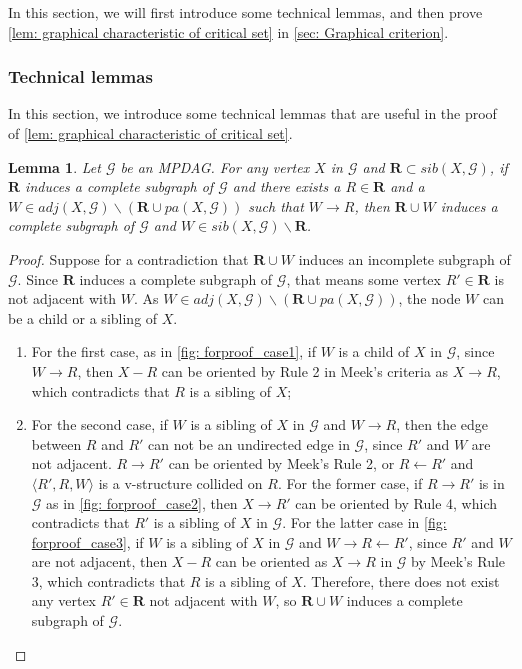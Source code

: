 \documentclass{article}
\newtheorem{lemma}[theorem]{Lemma}
\begin{document}
In this section, we will first introduce some technical lemmas, and then prove \cref{lem: graphical characteristic of critical set} in \cref{sec: Graphical criterion}. 


\subsubsection{Technical lemmas}
In this section, we introduce some technical lemmas that are useful in the proof of \cref{lem: graphical characteristic of critical set}.

\begin{lemma}\label{lem: complete2complete}
    Let $\mathcal{G}$ be an MPDAG. For any vertex $X$ in $\mathcal{G}$ and $\mathbf{R} \subset sib(X,\mathcal{G})$, if $\mathbf{R}$ induces a complete subgraph of $\mathcal{G}$ and there exists a $R \in \mathbf{R}$ and a $W \in {adj(X,\mathcal{G}) \backslash{(\mathbf{R} \cup pa(X,\mathcal{G}))}}$ such that $W \rightarrow R$, then $\mathbf{R} \cup W$ induces a complete subgraph of $\mathcal{G}$ and $W \in {sib(X,\mathcal{G}) \backslash{\mathbf{R}}}$.
\end{lemma}
\begin{proof}
     Suppose for a contradiction that $\mathbf{R} \cup W$ induces an incomplete subgraph of $\mathcal{G}$. Since $\mathbf{R}$ induces a complete subgraph of $\mathcal{G}$, that means some vertex $R' \in \mathbf{R}$ is not adjacent with $W$. As $W \in {adj(X,\mathcal{G}) \backslash{(\mathbf{R} \cup pa(X,\mathcal{G}))}}$, the node $W$ can be a child or a sibling of $X$.
     \begin{enumerate}[leftmargin=6.5mm]
        \itemsep0em
         \item [(1)] For the first case, as in \cref{fig: forproof_case1}, if $W$ is a child of $X$ in $\mathcal{G}$, since $W \rightarrow R$, then $X - R$ can be oriented by Rule 2 in Meek's criteria as $X \rightarrow R$, which contradicts that $R$ is a sibling of $X$;
         \item [(2)] For the second case, if $W$ is a sibling of $X$ in $\mathcal{G}$ and $W \rightarrow R$, then the edge between $R$ and $R'$ can not be an undirected edge in $\mathcal{G}$, since $R'$ and $W$ are not adjacent. $R \rightarrow R'$ can be oriented by Meek's Rule 2, or $R \leftarrow R'$ and $\langle R', R, W \rangle$ is a v-structure collided on $R$. For the former case, if $R \rightarrow R'$ is in $\mathcal{G}$ as in \cref{fig: forproof_case2}, then $X \rightarrow R'$ can be oriented by Rule 4, which contradicts that $R'$ is a sibling of $X$ in $\mathcal{G}$. For the latter case in \cref{fig: forproof_case3}, if $W$ is a sibling of $X$ in $\mathcal{G}$ and $W \rightarrow R \leftarrow R'$, since $R'$ and $W$ are not adjacent, then $X - R$ can be oriented as $X \rightarrow R$ in $\mathcal{G}$ by Meek's Rule 3, which contradicts that $R$ is a sibling of $X$. Therefore, there does not exist any vertex $R' \in \mathbf{R}$ not adjacent with $W$, so $\mathbf{R} \cup W$ induces a complete subgraph of $\mathcal{G}$.
     \end{enumerate}
\end{proof} 
\end{document}
